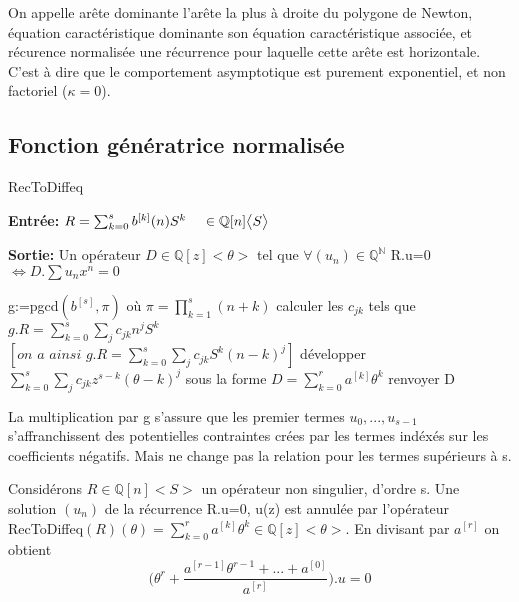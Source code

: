 \documentclass[a4paper,10.5pt]{article}
\begin{document}
	\begin{definition} On appelle arête dominante l'arête la plus à droite du polygone de Newton, équation caractéristique dominante son équation caractéristique associée, et récurence normalisée une récurrence pour laquelle cette arête est horizontale. C'est à dire que le comportement asymptotique est purement exponentiel, et non factoriel ($\kappa=0$).
	\end{definition}
	
	\subsection{Fonction génératrice normalisée}
	
	\begin{algorithm}
		\caption{RecToDiffeq}
		
		\vspace{2mm}
		
		\textbf{Entrée:} $R=\sum_{k=0}^{s} b^{[k]}(n)S^{k} \hspace{4mm} \in \mathbb{Q}[n]\big<S\big>$
		
		\textbf{Sortie:} Un opérateur $D \in \mathbb{Q}[z] \big<\theta\big>$ tel que $\forall (u_{n}) \in \mathbb{Q}^{\mathbb{N}}$ R.u=0 $\iff D.\sum u_{n}x^{n}=0$ 
		
		\begin{algorithmic}[1]
			\vspace{3mm}
			\STATE g:=pgcd$(b^{[s]},\pi)$ où $\pi=\prod_{k=1}^{s}(n+k)$
			\vspace{3mm}
			\STATE calculer les $c_{jk}$ tels que $g.R=\sum_{k=0}^{s}\sum_{j}c_{jk}n^{j}S^{k}$\\
			\vspace{3mm}
			$[\textit{on a ainsi } g.R=\sum_{k=0}^{s}\sum_{j}c_{jk}S^{k}(n-k)^{j}]$
			\vspace{3mm}
			\STATE développer $\sum_{k=0}^{s}\sum_{j} c_{jk}z^{s-k}(\theta-k)^{j}$ sous la forme $D=\sum_{k=0}^{r} a^{[k]}\theta^{k}$
			\vspace{3mm}
			\STATE renvoyer D
		\end{algorithmic}
		
	\end{algorithm}
	La multiplication par g s'assure que les premier termes $u_{0},...,u_{s-1}$
	s'affranchissent des potentielles contraintes crées par les termes indéxés sur les coefficients négatifs. Mais ne change pas la relation pour les termes supérieurs à s.
	
	Considérons $R \in \mathbb{Q}[n]\big< S\big>$ un opérateur non singulier, d'ordre s. Une solution $(u_{n})$ de la récurrence R.u=0, u(z) est annulée par l'opérateur RecToDiffeq$(R)(\theta)=\sum_{k=0}^{r}a^{[k]}\theta^{k} \in \mathbb{Q}[z]\big< \theta\big>$. En divisant par $a^{[r]}$ on obtient
	\begin{equation}
	\big(\theta^{r}+\frac{a^{[r-1]}\theta^{r-1}+...+a^{[0]}}{a^{[r]}}\big).u=0
	\end{equation}
\end{document}
